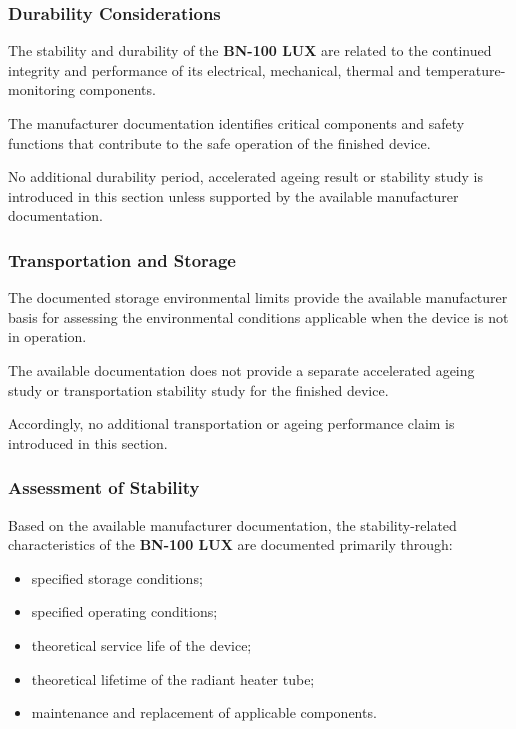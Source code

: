 \subsubsection{Durability Considerations}

The stability and durability of the \textbf{BN-100 LUX} are related to the
continued integrity and performance of its electrical, mechanical, thermal
and temperature-monitoring components.

The manufacturer documentation identifies critical components and safety
functions that contribute to the safe operation of the finished device.

No additional durability period, accelerated ageing result or stability
study is introduced in this section unless supported by the available
manufacturer documentation.

\subsubsection{Transportation and Storage}

The documented storage environmental limits provide the available
manufacturer basis for assessing the environmental conditions applicable
when the device is not in operation.

The available documentation does not provide a separate accelerated ageing
study or transportation stability study for the finished device.

Accordingly, no additional transportation or ageing performance claim is
introduced in this section.

\subsubsection{Assessment of Stability}

Based on the available manufacturer documentation, the stability-related
characteristics of the \textbf{BN-100 LUX} are documented primarily through:

\begin{itemize}

    \item specified storage conditions;

    \item specified operating conditions;

    \item theoretical service life of the device;

    \item theoretical lifetime of the radiant heater tube;

    \item maintenance and replacement of applicable components.

\end{itemize}

